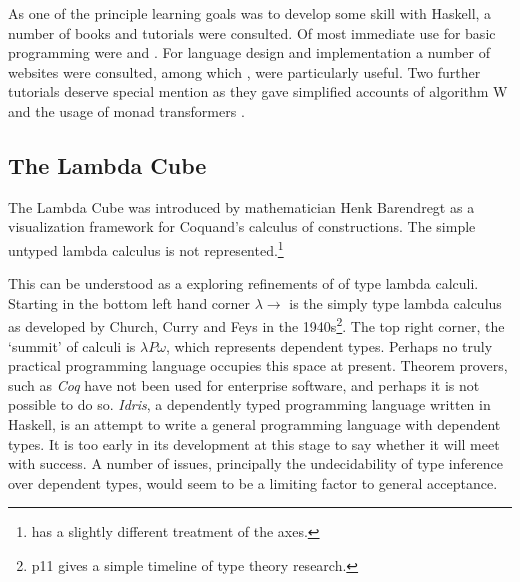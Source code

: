 \documentclass[12pt, a4paper]{report}
\begin{document}
As one of the principle learning goals was to develop some skill with Haskell, a number of books and
tutorials were consulted. Of most immediate use for basic programming were \cite{Lipovaca:2011:LYH:2018642}
and \cite{rwh}. For language design and implementation a number of websites were consulted, among which
\cite{scheme}, \cite{diehl} were particularly useful. Two further tutorials deserve special mention
as they gave simplified accounts of algorithm W \cite{algoW} and the usage of monad transformers
\cite{transformers}.

\subsection{The Lambda Cube}
The Lambda Cube was introduced by mathematician Henk Barendregt as a visualization framework for
Coquand's calculus of constructions\cite{Barendregt:1993:LCT:162552.162561}. The simple untyped lambda calculus is not
represented.\footnote{\cite{Pierce:2002:TPL:509043} has a slightly different treatment of the axes.}


This can be understood as a exploring refinements of of type lambda calculi. Starting in the bottom
left hand corner $\lambda \rightarrow$ is the simply type lambda calculus as developed by Church,
Curry and Feys in the 1940s\footnote{\cite{Pierce:2002:TPL:509043} p11 gives a simple timeline of
    type theory research.}. The top right corner, the `summit' of calculi is $\lambda P \omega$, which
represents dependent types. Perhaps no truly practical programming language occupies this space at
present. Theorem provers, such as \textit{Coq} have not been used for enterprise software, and
perhaps it is not possible to do so. \textit{Idris}, a dependently typed programming language
written in Haskell, is an attempt to write a general programming language with dependent types. It is
too early in its development at this stage to say whether it will meet with success. A number of
issues, principally the undecidability of type inference over dependent types, would seem to be a
limiting factor to general acceptance. 
\end{document}
